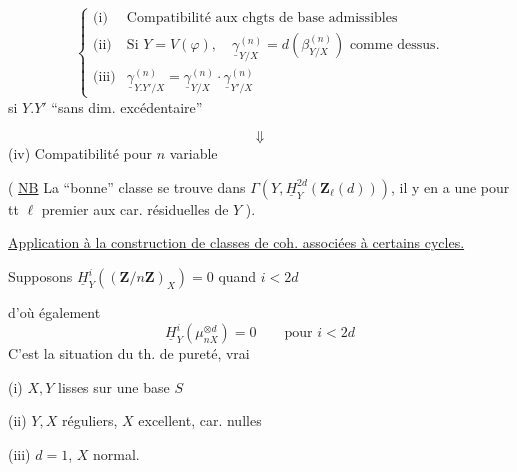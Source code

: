 \[
\left\{\begin{array}{ll}
\text{(i)} & \text{Compatibilité aux chgts de base admissibles}\\[4pt]
\text{(ii)} & \text{Si }Y=V(\varphi),\quad \underline\gamma_{Y/X}^{(n)}=d(\beta_{Y/X}^{(n)})\text{ comme dessus.}\\[4pt]
\text{(iii)} & \underline\gamma_{Y.Y'/X}^{(n)}=\underline\gamma_{Y/X}^{(n)}\cdot\underline\gamma_{Y'/X}^{(n)}
\end{array}\right.
\]
si $Y.Y'$ ``sans dim. excédentaire''

\[\Downarrow\]
(iv) Compatibilité pour $n$ variable

( \uline{NB} La ``bonne'' classe se trouve dans
$\Gamma(Y,\underline H^{2d}_Y(\mathbf Z_\ell(d)))$, il y en a une pour tt $\ell$ premier aux car. résiduelles de $Y$ ).

\uline{Application à la construction de classes de coh. associées à certains cycles.}

Supposons $\underline H^i_Y((\mathbf Z/n\mathbf Z)_X)=0$  quand $i<2d$

d'où également
\[
\underline H^i_Y(\mu_{nX}^{\otimes d})=0\qquad\text{pour }i<2d
\]
C'est la situation du th. de pureté, vrai

(i) $X,Y$ lisses sur une base $S$

(ii) $Y,X$ réguliers, $X$ excellent, car. nulles

(iii) $d=1$, $X$ normal.
